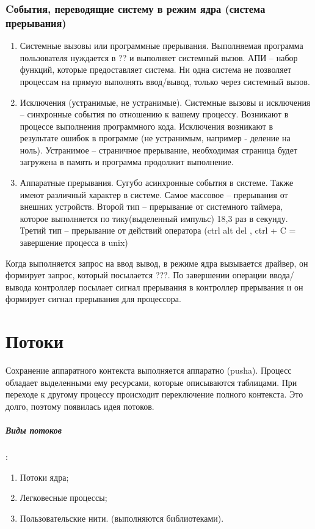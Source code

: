 \subsection{Cобытия, переводящие систему в режим ядра (система прерывания)}
\begin{enumerate}
    \item Системные вызовы или программные прерывания. Выполняемая программа пользователя нуждается в ?? и выполняет системный вызов. АПИ – набор функций, которые предоставляет система. Ни одна система не позволяет процессам на прямую выполнять ввод/вывод, только через системный вызов.
    \item Исключения (устранимые, не устранимые). Системные вызовы и исключения – синхронные события по отношению к вашему процессу. Возникают в процессе выполнения программного кода. Исключения возникают в результате ошибок в программе (не устранимым, например - деление на ноль). Устранимое – страничное прерывание, необходимая страница будет загружена в память и программа продолжит выполнение.
    \item Аппаратные прерывания. Сугубо асинхронные события в системе. Также имеют различный характер в системе. Самое массовое – прерывания от внешних устройств. Второй тип – прерывание от системного таймера, которое выполняется по тику(выделенный импульс) 18,3 раз в секунду.  Третий тип – прерывание от действий оператора (ctrl alt del , ctrl + C = завершение процесса в unix)
\end{enumerate}

Когда выполняется запрос на ввод вывод, в режиме ядра вызывается драйвер, он формирует запрос, который посылается ???. По завершении операции ввода/вывода контроллер посылает сигнал прерывания в контроллер прерывания и он формирует сигнал прерывания для процессора.

\chapter{Потоки}
Сохранение аппаратного контекста выполняется аппаратно (pusha). Процесс обладает выделенными ему ресурсами, которые описываются таблицами.  При переходе к другому процессу происходит переключение полного контекста. Это долго, поэтому появилась идея потоков. 

\paragraph{Виды потоков}: 
\begin{enumerate}
    \item Потоки ядра;
    \item Легковесные процессы;
    \item Пользовательские нити. (выполняются библиотеками).
\end{enumerate}

